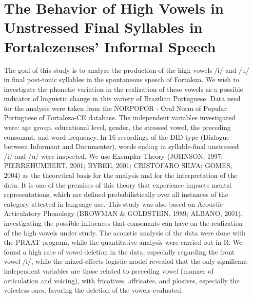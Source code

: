 \chapter{The Behavior of High Vowels in Unstressed Final Syllables in Fortalezenses' Informal Speech}\label{ch:franciscoaler5}
\begin{affils}
\end{affils}

The goal of this study is to analyze the production of the high vowels /i/ and /u/ in final post-tonic syllables in the spontaneous speech of Fortaleza. We wish to investigate the phonetic variation in the realization of these vowels as a possible indicator of linguistic change in this variety of Brazilian Portuguese. Data used for the analysis were taken from the NORPOFOR - Oral Norm of Popular Portuguese of Fortaleza-CE database. The independent variables investigated were: age group, educational level, gender, the stressed vowel, the preceding consonant, and word frequency. In 16 recordings of the DID type (Dialogue between Informant and Documenter), words ending in syllable-final unstressed /i/ and /u/ were inspected. We use Exemplar Theory (JOHNSON, 1997; PIERREHUMBERT, 2001; BYBEE, 2001; CRISTÓFARO SILVA; GOMES, 2004) as the theoretical basis for the analysis and for the interpretation of the data. It is one of the premises of this theory that experience impacts mental representations, which are defined probabilistically over all instances of the category attested in language use. This study was also based on Acoustic-Articulatory Phonology (BROWMAN \& GOLDSTEIN, 1989; ALBANO, 2001), investigating the possible influences that consonants can have on the realization of the high vowels under study. The acoustic analysis of the data were done with the PRAAT program, while the quantitative analysis were carried out in R. We found a high rate of vowel deletion in the data, especially regarding the front vowel /i/, while the mixed-effects logistic model revealed that the only significant independent variables are those related to preceding vowel (manner of articulation and voicing), with fricatives, affricates, and plosives, especially the voiceless ones, favoring the deletion of the vowels evaluated.
